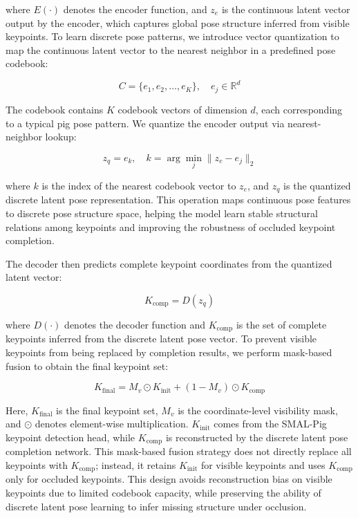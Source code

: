\documentclass[computers,article,submit,pdftex,moreauthors]{Definitions/mdpi}
\begin{document}
where $E(\cdot)$ denotes the encoder function, and $z_e$ is the continuous latent vector output by the encoder, which captures global pose structure inferred from visible keypoints. To learn discrete pose patterns, we introduce vector quantization to map the continuous latent vector to the nearest neighbor in a predefined pose codebook:

\begin{equation}
C = \{e_1, e_2, \ldots, e_K\}, \quad e_j \in \mathbb{R}^d
\end{equation}

The codebook contains $K$ codebook vectors of dimension $d$, each corresponding to a typical pig pose pattern. We quantize the encoder output via nearest-neighbor lookup:

\begin{equation}
z_q = e_k, \quad k = \arg\min_j \|z_e - e_j\|_2
\end{equation}

where $k$ is the index of the nearest codebook vector to $z_e$, and $z_q$ is the quantized discrete latent pose representation. This operation maps continuous pose features to discrete pose structure space, helping the model learn stable structural relations among keypoints and improving the robustness of occluded keypoint completion.

The decoder then predicts complete keypoint coordinates from the quantized latent vector:

\begin{equation}
K_{\text{comp}} = D(z_q)
\end{equation}

where $D(\cdot)$ denotes the decoder function and $K_{\text{comp}}$ is the set of complete keypoints inferred from the discrete latent pose vector. To prevent visible keypoints from being replaced by completion results, we perform mask-based fusion to obtain the final keypoint set:

\begin{equation}
K_{\text{final}} = M_v \odot K_{\text{init}} + (1 - M_v) \odot K_{\text{comp}}
\end{equation}

Here, $K_{\text{final}}$ is the final keypoint set, $M_v$ is the coordinate-level visibility mask, and $\odot$ denotes element-wise multiplication. $K_{\text{init}}$ comes from the SMAL-Pig keypoint detection head, while $K_{\text{comp}}$ is reconstructed by the discrete latent pose completion network. This mask-based fusion strategy does not directly replace all keypoints with $K_{\text{comp}}$; instead, it retains $K_{\text{init}}$ for visible keypoints and uses $K_{\text{comp}}$ only for occluded keypoints. This design avoids reconstruction bias on visible keypoints due to limited codebook capacity, while preserving the ability of discrete latent pose learning to infer missing structure under occlusion.
\end{document}
